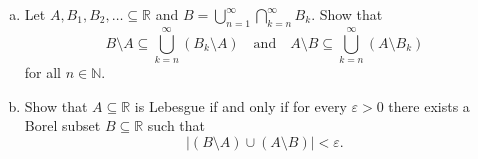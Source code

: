 \documentclass[10pt]{article}
\providecommand{\eps}{\varepsilon}
\providecommand{\NN}{\mathbb N}
\providecommand{\RR}{\mathbb R}
\providecommand{\ii}{\item}
\providecommand{\abs}[1]{\left|#1\right|}
\begin{document}
\pagebreak

\begin{problem}
    \begin{enumerate}[(a)]
	\ii Let $A,B_1,B_2,\ldots\subseteq\RR$ and
	$B = \bigcup_{n=1}^\infty \bigcap_{k=n}^\infty B_k$. Show that
	\begin{equation*}
	    B\setminus A\subseteq\bigcup_{k=n}^\infty (B_k\setminus A)
	    \quad\text{and}\quad
	    A\setminus B\subseteq\bigcup_{k=n}^\infty (A\setminus B_k)
	\end{equation*}
	for all $n\in\NN$.
	\ii Show that $A\subseteq\RR$ is Lebesgue if and only if
	for every $\eps>0$ there exists a Borel subset $B\subseteq\RR$
	such that
	\begin{equation*}
	    \abs{(B\setminus A)\cup(A\setminus B)} < \eps.
	\end{equation*}
    \end{enumerate}
\end{problem}
\end{document}
